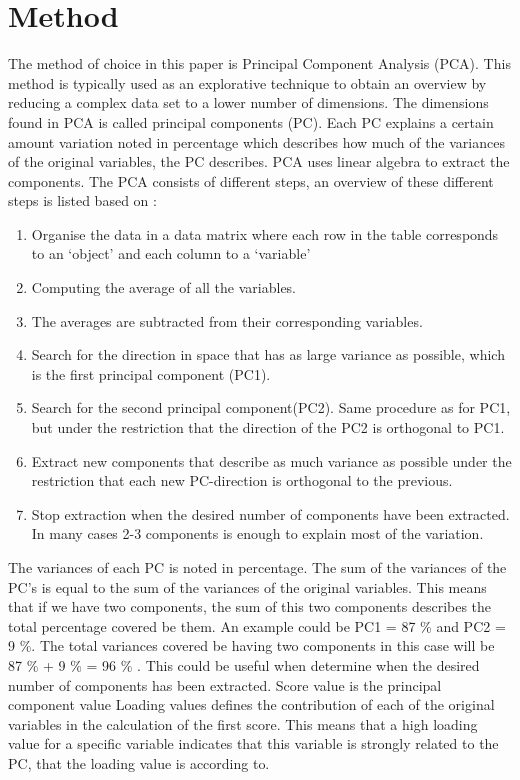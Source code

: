 \section*{Method}
\label{Method}
%
The method of choice in this paper is Principal Component Analysis (PCA). This method is typically used as an explorative technique to obtain an overview by reducing a complex data set to a lower number of dimensions. The dimensions found in PCA is called principal components (PC). Each PC explains a certain amount variation noted in percentage which describes how much of the variances of the original variables, the PC describes.\blankline
%
PCA uses linear algebra to extract the components. The PCA consists of different steps, an overview of these different steps is listed based on \textcite[pp. 211-213]{Naes2010}:

\begin{enumerate}
	\item Organise the data in a data matrix where each row in the table corresponds to an ‘object’ and each column to a ‘variable’
	\item Computing the average of all the variables. 
	\item The averages are subtracted from their corresponding variables.
	\item Search for the direction in space that has as large variance as possible, which is the first principal component (PC1).
	\item Search for the second principal component(PC2). Same procedure as for PC1, but under the restriction that the direction of the PC2 is orthogonal to PC1. 
	\item Extract new components that describe as much variance as possible under the restriction that each new PC-direction is orthogonal to the previous.
	\item Stop extraction when the desired number of components have been extracted. In many cases 2-3 components is enough to explain most of the variation. 
\end{enumerate}
\blankline
%
The variances of each PC is noted in percentage.
The sum of the variances of the PC's is equal to the sum of the variances of the original variables. This means that if we have two components, the sum of this two components describes the total percentage covered be them. An example could be PC1 = 87 \% and PC2 = 9 \%. The total variances covered be having two components in this case will be 87 \% + 9 \% = 96 \% \parencite[p. 213]{Naes2010}. This could be useful when determine when the desired number of components has been extracted. \blankline
%
Score value is the principal component value 
Loading values defines the contribution of each of the original variables in the calculation of the first score. This means that a high loading value for a specific variable indicates that this variable is strongly related to the PC, that the loading value is according to. 

